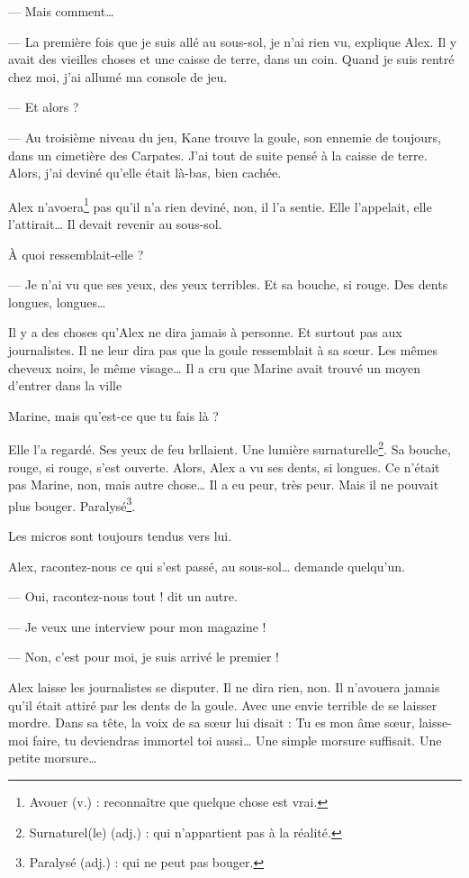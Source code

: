 --- Mais comment\ldots{}

--- La première fois que je suis allé au sous-sol, je n'ai rien vu, explique Alex. Il y avait des vieilles choses et une caisse
    de terre, dans un coin. Quand je suis rentré chez moi, j'ai allumé ma console de jeu.

--- Et alors ?

--- Au troisième niveau du jeu, Kane trouve la goule, son ennemie de toujours, dans un cimetière des Carpates. J'ai tout de suite
    pensé à la caisse de terre. Alors, j'ai deviné qu'elle était là-bas, bien cachée. \fg{}

Alex n'avoera\footnote{Avouer (v.) : reconnaître que quelque chose est vrai.} pas qu'il n'a rien deviné, non, il l'a sentie. Elle
l'appelait, elle l'attirait\ldots{} Il devait revenir au sous-sol.

\og À quoi ressemblait-elle ?

--- Je n'ai vu que ses yeux, des yeux terribles. Et sa bouche, si rouge. Des dents longues, longues\ldots{} \fg{}

Il y a des choses qu'Alex ne dira jamais à personne. Et surtout pas aux journalistes. Il ne leur dira pas que la goule ressemblait
à sa s\oe{}ur. Les mêmes cheveux noirs, le même visage\ldots{} Il a cru que Marine avait trouvé un moyen d'entrer dans la ville

\og Marine, mais qu'est-ce que tu fais là ? \fg{}

Elle l'a regardé. Ses yeux de feu brllaient. Une lumière surnaturelle\footnote{Surnaturel(le) (adj.) : qui n'appartient pas à la
réalité.}. Sa bouche, rouge, si rouge, s'est ouverte. Alors, Alex a vu ses dents, si longues. Ce n'était pas Marine, non, mais
autre chose\ldots{} Il a eu peur, très peur. Mais il ne pouvait plus bouger. Paralysé\footnote{Paralysé (adj.) : qui ne peut pas
bouger.}.

Les micros sont toujours tendus vers lui.

\og Alex, racontez-nous ce qui s'est passé, au sous-sol\ldots{} demande quelqu'un.

--- Oui, racontez-nous tout ! dit un autre.

--- Je veux une interview pour mon magazine !

--- Non, c'est pour moi, je suis arrivé le premier ! \fg{}

Alex laisse les journalistes se disputer. Il ne dira rien, non. Il n'avouera jamais qu'il était attiré par les dents de la goule.
Avec une envie terrible de se laisser mordre. Dans sa tête, la voix de sa s\oe{}ur lui disait : \og Tu es mon âme s\oe{}ur,
laisse-moi faire, tu deviendras immortel toi aussi\ldots{} \fg{} Une simple morsure suffisait. Une petite morsure\ldots{}

